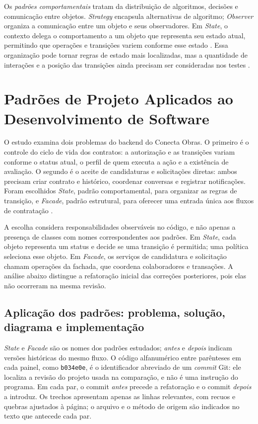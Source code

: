 \documentclass[12pt]{article}
\begin{document}
Os \emph{padrões comportamentais} tratam da distribuição de algoritmos, decisões e comunicação entre objetos. \emph{Strategy} encapsula alternativas de algoritmo; \emph{Observer} organiza a comunicação entre um objeto e seus observadores. Em \emph{State}, o contexto delega o comportamento a um objeto que representa seu estado atual, permitindo que operações e transições variem conforme esse estado \cite{gamma1994}. Essa organização pode tornar regras de estado mais localizadas, mas a quantidade de interações e a posição das transições ainda precisam ser consideradas nos testes \cite{baudry2003}.

\section{Padrões de Projeto Aplicados ao Desenvolvimento de Software}

O estudo examina dois problemas do backend do Conecta Obras. O primeiro é o controle do ciclo de vida dos contratos: a autorização e as transições variam conforme o status atual, o perfil de quem executa a ação e a existência de avaliação. O segundo é o aceite de candidaturas e solicitações diretas: ambos precisam criar contrato e histórico, coordenar conversas e registrar notificações. Foram escolhidos \emph{State}, padrão comportamental, para organizar as regras de transição, e \emph{Facade}, padrão estrutural, para oferecer uma entrada única aos fluxos de contratação \cite{gamma1994}.

A escolha considera responsabilidades observáveis no código, e não apenas a presença de classes com nomes correspondentes aos padrões. Em \emph{State}, cada objeto representa um status e decide se uma transição é permitida; uma política seleciona esse objeto. Em \emph{Facade}, os serviços de candidatura e solicitação chamam operações da fachada, que coordena colaboradores e transações. A análise abaixo distingue a refatoração inicial das correções posteriores, pois elas não ocorreram na mesma revisão.

\subsection{Aplicação dos padrões: problema, solução, diagrama e implementação}

\emph{State} e \emph{Facade} são os nomes dos padrões estudados; \emph{antes} e \emph{depois} indicam versões históricas do mesmo fluxo. O código alfanumérico entre parênteses em cada painel, como \texttt{b034e0e}, é o identificador abreviado de um \emph{commit} Git: ele localiza a revisão do projeto usada na comparação, e não é uma instrução do programa. Em cada par, o commit \emph{antes} precede a refatoração e o commit \emph{depois} a introduz. Os trechos apresentam apenas as linhas relevantes, com recuos e quebras ajustados à página; o arquivo e o método de origem são indicados no texto que antecede cada par.
\end{document}

